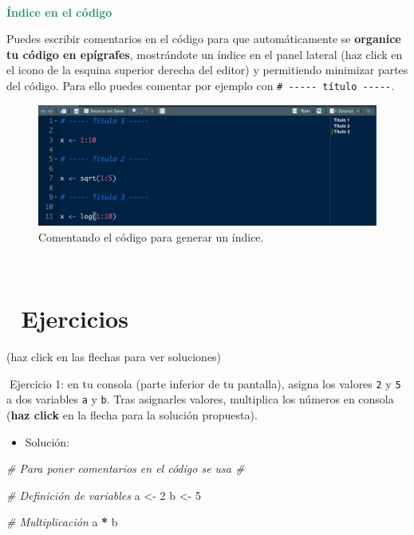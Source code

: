 \documentclass[11pt,]{book}
\newenvironment{Shaded}{\begin{snugshade}}{\end{snugshade}}
\newcommand{\CommentTok}[1]{\textcolor[rgb]{0.37,0.37,0.37}{\textit{#1}}}
\newcommand{\DecValTok}[1]{\textcolor[rgb]{0.06,0.06,0.06}{#1}}
\newcommand{\NormalTok}[1]{#1}
\newcommand{\OperatorTok}[1]{\textcolor[rgb]{0.43,0.43,0.43}{\textbf{#1}}}
\newcommand{\StringTok}[1]{\textcolor[rgb]{0.5,0.5,0.5}{#1}}
\providecommand{\tightlist}{%
  \setlength{\itemsep}{0pt}\setlength{\parskip}{0pt}}
\begin{document}
~

\textbf{\textcolor{#20935E}{Índice en el código}}

Puedes escribir comentarios en el código para que automáticamente se \textbf{organice tu código en epígrafes}, mostrándote un índice en el panel lateral (haz click en el icono de la esquina superior derecha del editor) y permitiendo minimizar partes del código. Para ello puedes comentar por ejemplo con \texttt{\#\ -\/-\/-\/-\/-\ título\ -\/-\/-\/-\/-}.

\begin{figure}

{\centering \includegraphics[width=0.7\linewidth]{./img/comentarios-indice} 

}

\caption{Comentando el código para generar un índice.}\label{fig:unnamed-chunk-16}
\end{figure}

~

\hypertarget{ejercicios}{%
\section{📝 Ejercicios}\label{ejercicios}}

(haz click en las flechas para ver soluciones)

📝Ejercicio 1: en tu consola (parte inferior de tu pantalla), asigna los valores \texttt{2} y \texttt{5} a dos variables \texttt{a} y \texttt{b}. Tras asignarles valores, multiplica los números en consola (\textbf{haz click} en la flecha para la solución propuesta).

\begin{itemize}
\tightlist
\item
  Solución:
\end{itemize}

\begin{Shaded}
\begin{Highlighting}[]
\CommentTok{# Para poner comentarios en el código se usa #}

\CommentTok{# Definición de variables}
\NormalTok{a <-}\StringTok{ }\DecValTok{2}
\NormalTok{b <-}\StringTok{ }\DecValTok{5}

\CommentTok{# Multiplicación}
\NormalTok{a }\OperatorTok{*}\StringTok{ }\NormalTok{b}
\end{Highlighting}
\end{Shaded}
\end{document}
